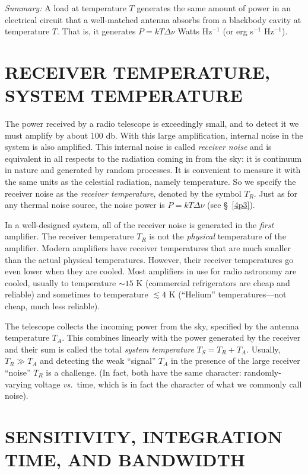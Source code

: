 \documentclass[12pt,psfig,preprint]{aastex}
\begin{document}
	{\it Summary:} A load at temperature $T$ generates the same amount
of power in an electrical circuit that a well-matched antenna absorbs
from a blackbody cavity at temperature $T$. That is, it generates
$P = kT\Delta \nu$ Watts Hz$^{-1}$ (or erg s$^{-1}$ Hz$^{-1}$). 

\section {RECEIVER TEMPERATURE, SYSTEM TEMPERATURE} \label{two}

	The power received by a radio telescope is exceedingly small,
and to detect it we must amplify by about 100 db.  With this large
amplification, internal noise in the system is also amplified.  This
internal noise is called {\it receiver noise} and is equivalent in all
respects to the radiation coming in from the sky: it is continuum in
nature and generated by random processes.  It is convenient to measure
it with the same units as the celestial radiation, namely temperature. 
So we specify the receiver noise as the {\it receiver temperature},
denoted by the symbol $T_R$.  Just as for any thermal noise source, the
noise power is $P = kT \Delta \nu$ (see \S~\ref{4p3}). 

	In a well-designed system, all of the receiver noise is
generated in the {\it first} amplifier. The receiver temperature $T_R$
is not the {\it physical} temperature of the amplifier.  Modern
amplifiers have receiver temperatures that are much smaller than the
actual physical temperatures.  However, their receiver temperatures go
even lower when they are cooled.  Most amplifiers in use for radio
astronomy are cooled, usually to temperature $\sim 15$ K (commercial
refrigerators are cheap and reliable) and sometimes to temperature
$\lesssim 4$ K (``Helium'' temperatures---not cheap, much less
reliable). 

	The telescope collects the incoming power from the sky,
specified by the antenna temperature $T_A$. This combines linearly with
the power generated by the receiver and their sum is called the total
{\it system temperature} $T_S = T_R + T_A$.  Usually, $T_R \gg T_A$ and
detecting the weak ``signal'' $T_A$ in the presence of the large
receiver ``noise'' $T_R$ is a challenge.  (In fact, both have the same
character: randomly-varying voltage {\it vs.}\ time, which is in fact the
character of what we commonly call noise). 

\section {SENSITIVITY, INTEGRATION TIME, AND BANDWIDTH} 
\end{document}

